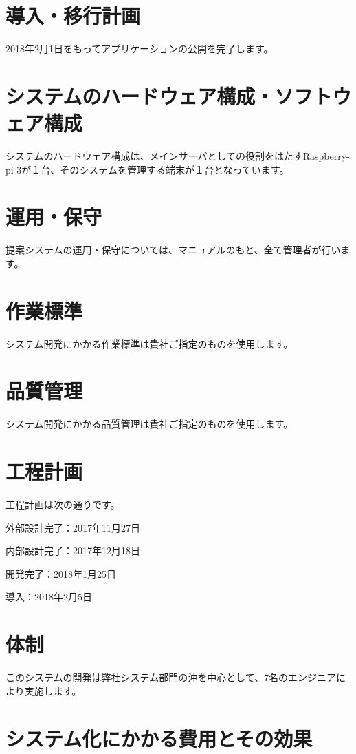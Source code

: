 \documentclass[a4j,titlepage]{ujarticle}
\begin{document}
\section{導入・移行計画}
2018年2月1日をもってアプリケーションの公開を完了します。

\section{システムのハードウェア構成・ソフトウェア構成}
システムのハードウェア構成は、メインサーバとしての役割をはたすRaspberry-pi 3が１台、そのシステムを管理する端末が１台となっています。 %

\section{運用・保守}
提案システムの運用・保守については、マニュアルのもと、全て管理者が行います。 %

\section{作業標準}
システム開発にかかる作業標準は貴社ご指定のものを使用します。

\section{品質管理}
システム開発にかかる品質管理は貴社ご指定のものを使用します。

\section{工程計画}
工程計画は次の通りです。

外部設計完了：2017年11月27日

内部設計完了：2017年12月18日

開発完了：2018年1月25日

導入：2018年2月5日

\section{体制}
このシステムの開発は弊社システム部門の沖を中心として、7名のエンジニアにより実施します。

\section{システム化にかかる費用とその効果}
\end{document}
